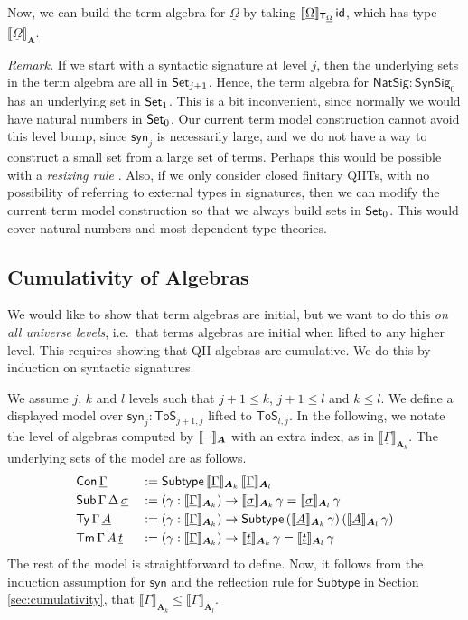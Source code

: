 \documentclass[sigplan,review,anonymous]{acmart}\settopmatter{printfolios=true,printccs=false,printacmref=false}
\newcommand{\ToS}{\mathsf{ToS}}
\newcommand{\Subtype}{\mathsf{Subtype}}
\newcommand{\NatSig}{\mathsf{NatSig}}
\newcommand{\syn}{\mathsf{syn}}
\newcommand{\SynSig}{\mathsf{SynSig}}
\newcommand{\bA}{\boldsymbol{A}}
\newcommand{\bT}{\boldsymbol{\mathsf{T}}}
\newcommand{\ul}[1]{\underline{#1}}
\newcommand{\ulGamma}{\ul{\Gamma}}
\newcommand{\ulOmega}{\ul{\Omega}}
\newcommand{\ulsigma}{\ul{\sigma}}
\newcommand{\ult}{\ul{t}}
\newcommand{\ulA}{\ul{A}}
\newcommand{\llb}{\llbracket}
\newcommand{\rrb}{\rrbracket}
\begin{document}
Now, we can build the term algebra for $\ulOmega$ by taking
$\llb\ulOmega\rrb_{\bT_{\ulOmega}}\,\id$, which has type $\llb\ulOmega\rrb_{\bA}$.

\emph{Remark.} If we start with a syntactic signature at level $j$, then the
underlying sets in the term algebra are all in $\mathsf{Set}_{j+1}$. Hence, the term
algebra for $\NatSig : \SynSig_0$ has an underlying set in $\mathsf{Set}_1$. This is
a bit inconvenient, since normally we would have natural numbers in $\mathsf{Set}_0$. Our
current term model construction cannot avoid this level bump, since $\syn_j$ is
necessarily large, and we do not have a way to construct a small set from
a large set of terms. Perhaps this would be possible with a \emph{resizing rule}
\cite{voevodsky2011resizing}. Also, if we only consider closed finitary QIITs,
with no possibility of referring to external types in signatures, then we can
modify the current term model construction so that we always build sets in
$\mathsf{Set}_0$. This would cover natural numbers and most dependent type theories.

\subsection{Cumulativity of Algebras}

We would like to show that term algebras are initial, but we want to do this
\emph{on all universe levels}, i.e.\ that terms algebras are initial when lifted
to any higher level. This requires showing that QII algebras are
cumulative. We do this by induction on syntactic signatures.

\begin{definition} We assume $j$, $k$ and $l$ levels such that $j+1 \leq k$, $j+1 \leq l$ and $k \leq l$. We define a displayed model over $\syn_j : \ToS_{j+1, j}$ lifted to
$\ToS_{l, j}$. In the following, we notate the level of algebras computed by
  $\llb\blank\rrb_{\bA}$ with an extra index, as in
  $\llb\ulGamma\rrb_{\bA_k}$. The underlying sets of the model are as follows.
\begin{alignat*}{3}
  & \Con\,\ulGamma && := \Subtype\,\llb\ulGamma\rrb_{\bA_k}\,\llb\ulGamma\rrb_{\bA_l}\\
  & \Sub\,\Gamma\,\Delta\,\ulsigma && := (\gamma : \llb\ulGamma\rrb_{\bA_k})\ra
  \llb\ulsigma\rrb_{\bA_k}\,\gamma = \llb\ulsigma\rrb_{\bA_l}\,\gamma\\
  & \Ty\,\Gamma\,\ulA &&:= (\gamma : \llb\ulGamma\rrb_{\bA_k})\ra
      \Subtype\,(\llb\ulA\rrb_{\bA_k}\,\gamma)\,(\llb\ulA\rrb_{\bA_l}\,\gamma)\\
  & \Tm\,\Gamma\,A\,\ult &&:= (\gamma : \llb\ulGamma\rrb_{\bA_k})\ra
     \llb\ult\rrb_{\bA_k}\,\gamma = \llb\ult\rrb_{\bA_l}\,\gamma
\end{alignat*}
The rest of the model is straightforward to define. Now, it follows from the
induction assumption for $\syn$ and the reflection rule for $\Subtype$ in
Section \ref{sec:cumulativity}, that $\llb\ulGamma\rrb_{\bA_k} \leq
\llb\ulGamma\rrb_{\bA_l}$.
\end{definition}
\end{document}
